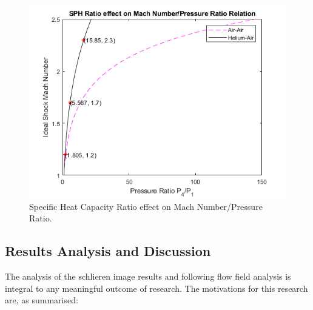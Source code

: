 \begin{figure}[H] 
	\centering
	\includegraphics[scale=0.9]{fig1.png} 
	\caption{Specific Heat Capacity Ratio effect on Mach Number/Pressure Ratio.}
	\label{fig:1}
\end{figure}

\subsection{Results Analysis and Discussion}
The analysis of the schlieren image results and following flow field analysis is integral to any meaningful outcome of research. The motivations for this research are, as summarised:  

